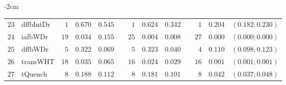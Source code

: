 \begin{table*}[!htbp]
\begin{adjustwidth*}{}{-2cm}
\begin{tabular}{@{}rlrrrrrrrrrcc@{}}
\footnotesize{$23$} & \footnotesize{dffbIntDr} & \footnotesize{$1 $} & \footnotesize{$0.670$} & \footnotesize{$0.545$} && \footnotesize{$1 $} & \footnotesize{$0.624$} & \footnotesize{$0.342$} && \footnotesize{$1 $} & \footnotesize{$0.204$} & \footnotesize{$(0.182;0.230)$} \\
\footnotesize{$24$} & \footnotesize{iafbWDr  } & \footnotesize{$19$} & \footnotesize{$0.034$} & \footnotesize{$0.155$} && \footnotesize{$25$} & \footnotesize{$0.004$} & \footnotesize{$0.008$} && \footnotesize{$27$} & \footnotesize{$0.000$} & \footnotesize{$(0.000;0.000)$} \\
\footnotesize{$25$} & \footnotesize{dffbWDr  } & \footnotesize{$5 $} & \footnotesize{$0.322$} & \footnotesize{$0.069$} && \footnotesize{$5 $} & \footnotesize{$0.323$} & \footnotesize{$0.040$} && \footnotesize{$4 $} & \footnotesize{$0.110$} & \footnotesize{$(0.098;0.123)$} \\
\footnotesize{$26$} & \footnotesize{transWHT } & \footnotesize{$18$} & \footnotesize{$0.035$} & \footnotesize{$0.065$} && \footnotesize{$16$} & \footnotesize{$0.024$} & \footnotesize{$0.029$} && \footnotesize{$16$} & \footnotesize{$0.001$} & \footnotesize{$(0.001;0.001)$} \\
\footnotesize{$27$} & \footnotesize{tQuench  } & \footnotesize{$8 $} & \footnotesize{$0.188$} & \footnotesize{$0.112$} && \footnotesize{$8 $} & \footnotesize{$0.181$} & \footnotesize{$0.101$} && \footnotesize{$8 $} & \footnotesize{$0.042$} & \footnotesize{$(0.037;0.048)$} \\
\bottomrule
\end{tabular}
\end{adjustwidth*}
\end{table*}


